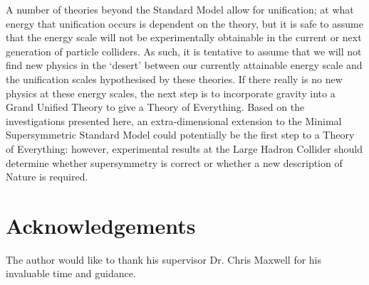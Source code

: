 \documentclass[12pt,a4paper,oneside]{article}
\begin{document}
\vspace{1em}

A number of theories beyond the Standard Model allow for unification; at what energy that unification occurs is dependent on the theory, but it is safe to assume that the energy scale will not be experimentally obtainable in the current or next generation of particle colliders. As such, it is tentative to assume that we will not find new physics in the `desert' between our currently attainable energy scale and the unification scales hypothesised by these theories. If there really is no new physics at these energy scales, the next step is to incorporate gravity into a Grand Unified Theory to give a Theory of Everything. Based on the investigations presented here, an extra-dimensional extension to the Minimal Supersymmetric Standard Model could potentially be the first step to a Theory of Everything: however, experimental results at the Large Hadron Collider should determine whether supersymmetry is correct or whether a new description of Nature is required.

\section*{Acknowledgements}
The author would like to thank his supervisor Dr. Chris Maxwell for his invaluable time and guidance.
\end{document}
